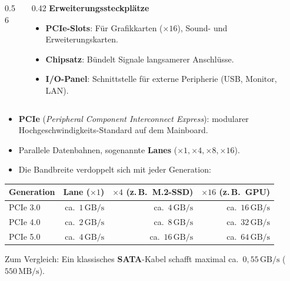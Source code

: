 \begin{frame}
\begin{columns}[c,onlytextwidth]
    \begin{column}{0.56\textwidth}
        \centering
    \end{column}
    \begin{column}{0.42\textwidth}
        \large\bfseries\color{DarkSlateGray!90!black}Erweiterungssteckplätze\par\vspace{3mm}
        \normalsize\normalfont
        \begin{itemize}\setlength\itemsep{6pt}
            \item \textbf{PCIe-Slots}: Für Grafikkarten ($\times 16$), Sound- und Erweiterungskarten.
            \item \textbf{Chipsatz}: Bündelt Signale langsamerer Anschlüsse.
            \item \textbf{I/O-Panel}: Schnittstelle für externe Peripherie (USB, Monitor, LAN).
        \end{itemize}
    \end{column}
\end{columns}
\end{frame}

\begin{frame}
\begin{itemize}\setlength\itemsep{4pt}
  \item \textbf{\gls{PCIe}} (\emph{Peripheral Component Interconnect Express}): modularer Hochgeschwindigkeits-Standard auf dem Mainboard.
  \item Parallele Datenbahnen, sogenannte \textbf{Lanes} ($\times 1, \times 4, \times 8, \times 16$).
  \item Die Bandbreite verdoppelt sich mit jeder Generation:
\end{itemize}
\begin{center}\small
\begin{tabular}{lrrr}
    \textbf{Generation} & \textbf{Lane ($\times 1$)} & \textbf{$\times 4$ (z.\,B.\ M.2-SSD)} & \textbf{$\times 16$ (z.\,B.\ GPU)} \\\midrule
    PCIe 3.0 & ca.\ $1\,\mathrm{GB/s}$ & ca.\ $4\,\mathrm{GB/s}$ & ca.\ $16\,\mathrm{GB/s}$ \\
    PCIe 4.0 & ca.\ $2\,\mathrm{GB/s}$ & ca.\ $8\,\mathrm{GB/s}$ & ca.\ $32\,\mathrm{GB/s}$ \\
    PCIe 5.0 & ca.\ $4\,\mathrm{GB/s}$ & ca.\ $16\,\mathrm{GB/s}$ & ca.\ $64\,\mathrm{GB/s}$ \\
\end{tabular}
\end{center}
\vspace{1mm}
\footnotesize Zum Vergleich: Ein klassisches \textbf{SATA}-Kabel schafft maximal ca.\ $0{,}55\,\mathrm{GB/s}$ ($550\,\mathrm{MB/s}$).
\end{frame}

